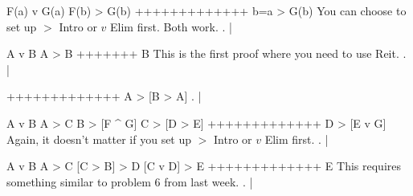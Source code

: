 \argument
 F(a) v G(a)
 F(b) > G(b)
+++++++++++++
 b=a > G(b)
\endargument
\Hint You can choose to set up $>$ Intro or $v$ Elim first. Both work.
        \answer
        . | 
        \endfitchproof
        \endanswer

\argument
 A v B
 A > B
+++++++
 B
\endargument
\Hint This is the first proof where you need to use Reit.
        \answer
        . | 
        \endfitchproof
        \endanswer

\argument

+++++++++++++
 A > [B > A]
\endargument
        \answer\resetfitchsetup
        . | 
        \endfitchproof
        \endanswer

\argument
 A v B
 A > C
 B > [F ^ G]
 C > [D > E]
+++++++++++++
 D > [E v G]
\endargument
\Hint Again, it doesn't matter if you set up $>$ Intro or $v$ Elim first.
        \answer
        . | 
        \endfitchproof
        \endanswer

\argument
 A v B
 A > C
 [C > B] > D
 [C v D] > E
+++++++++++++
 E
\endargument
\Hint This requires something similar to problem 6 from last week.
        \answer
        . | 
        \endfitchproof
        \endanswer

\endproblems
\bye
